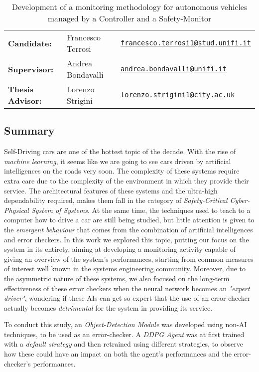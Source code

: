 \documentclass{article}
\begin{document}
\begin{table}[]
\centering
\caption*{Development of a monitoring methodology for autonomous vehicles managed by a Controller and a Safety-Monitor}
\begin{tabular}{lll}
\textbf{Candidate:}   & Francesco Terrosi & \href{mailto:francesco.terrosi1@stud.unifi.it}{\texttt{francesco.terrosi1@stud.unifi.it}}  \\
\textbf{Supervisor:}    & Andrea Bondavalli  & \href{mailto:andrea.bondavalli@unifi.it}{\texttt{andrea.bondavalli@unifi.it}}                           \\
\textbf{Thesis Advisor:} & Lorenzo Strigini   & \href{mailto:lorenzo.strigini1@city.ac.uk}{\texttt{lorenzo.strigini1@city.ac.uk}}                          
\end{tabular}
\end{table}
\subsection*{Summary}
Self-Driving cars are one of the hottest topic of the decade. With the rise of \textsl{machine learning}, it seems like we are going to see cars driven by artificial intelligences on the roads very soon. The complexity of these systems require extra care due to the complexity of the environment in which they provide their service. The architectural features of these systems and the ultra-high dependability required, makes them fall in the category of \textsl{Safety-Critical Cyber-Physical System of Systems}.
At the same time, the techniques used to teach to a computer how to drive a car are still being studied, but little attention is given to the \textsl{emergent behaviour} that comes from the combination of artificial intelligences and error checkers.
In this work we explored this topic, putting our focus on the system in its entirety, aiming at developing a monitoring activity capable of giving an overview of the system's performances, starting from common measures of interest well known in the systems engineering community.
Moreover, due to the asymmetric nature of these systems, we also focused on the long-term effectiveness of these error checkers when the neural network becomes an \textsl{"expert driver"}, wondering if these AIs can get so expert that the use of an error-checker actually becomes \textsl{detrimental} for the system in providing its service.

To conduct this study, an \textsl{Object-Detection Module} was developed using non-AI techniques, to be used as an error-checker. A \textsl{DDPG Agent} was at first trained with a \textsl{default strategy} and then retrained using different strategies, to observe how these could have an impact on both the agent's performances and the error-checker's performances.
\end{document}
